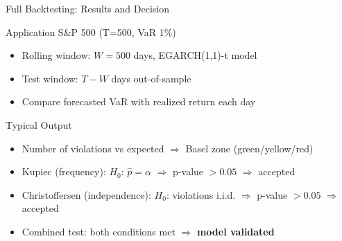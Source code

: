 \documentclass[9pt, aspectratio=169, t]{beamer}
\begin{document}
\begin{frame}{Full Backtesting: Results and Decision}
\small
\begin{block}{Application S\&P 500 (T=500, VaR 1\%)}
    \begin{itemize}\setlength{\itemsep}{0pt}
        \item Rolling window: $W = 500$ days, EGARCH(1,1)-t model
        \item Test window: $T - W$ days out-of-sample
        \item Compare forecasted VaR with realized return each day
    \end{itemize}
\end{block}
\begin{exampleblock}{Typical Output}
    \begin{itemize}\setlength{\itemsep}{0pt}
        \item Number of violations vs expected $\Rightarrow$ Basel zone (green/yellow/red)
        \item Kupiec (frequency): $H_0$: $\hat{p} = \alpha$ $\Rightarrow$ p-value $> 0.05$ $\Rightarrow$ accepted
        \item Christoffersen (independence): $H_0$: violations i.i.d. $\Rightarrow$ p-value $> 0.05$ $\Rightarrow$ accepted
        \item Combined test: both conditions met $\Rightarrow$ \textcolor{Forest}{\textbf{model validated}}
    \end{itemize}
\end{exampleblock}
\end{frame}
\end{document}

